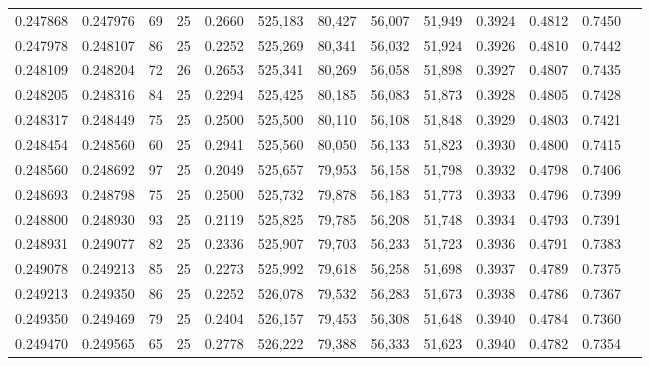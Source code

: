 \begin{tabular}{rrrrrrrrrrrrr}
0.247868 & 0.247976 &    69 &  25 &                                     0.2660 & 525,183 &  80,427 &  56,007 &  51,949 & 0.3924 & 0.4812 & 0.7450 \\
0.247978 & 0.248107 &    86 &  25 &                                     0.2252 & 525,269 &  80,341 &  56,032 &  51,924 & 0.3926 & 0.4810 & 0.7442 \\
0.248109 & 0.248204 &    72 &  26 &                                     0.2653 & 525,341 &  80,269 &  56,058 &  51,898 & 0.3927 & 0.4807 & 0.7435 \\
0.248205 & 0.248316 &    84 &  25 &                                     0.2294 & 525,425 &  80,185 &  56,083 &  51,873 & 0.3928 & 0.4805 & 0.7428 \\
0.248317 & 0.248449 &    75 &  25 &                                     0.2500 & 525,500 &  80,110 &  56,108 &  51,848 & 0.3929 & 0.4803 & 0.7421 \\
0.248454 & 0.248560 &    60 &  25 &                                     0.2941 & 525,560 &  80,050 &  56,133 &  51,823 & 0.3930 & 0.4800 & 0.7415 \\
0.248560 & 0.248692 &    97 &  25 &                                     0.2049 & 525,657 &  79,953 &  56,158 &  51,798 & 0.3932 & 0.4798 & 0.7406 \\
0.248693 & 0.248798 &    75 &  25 &                                     0.2500 & 525,732 &  79,878 &  56,183 &  51,773 & 0.3933 & 0.4796 & 0.7399 \\
0.248800 & 0.248930 &    93 &  25 &                                     0.2119 & 525,825 &  79,785 &  56,208 &  51,748 & 0.3934 & 0.4793 & 0.7391 \\
0.248931 & 0.249077 &    82 &  25 &                                     0.2336 & 525,907 &  79,703 &  56,233 &  51,723 & 0.3936 & 0.4791 & 0.7383 \\
0.249078 & 0.249213 &    85 &  25 &                                     0.2273 & 525,992 &  79,618 &  56,258 &  51,698 & 0.3937 & 0.4789 & 0.7375 \\
0.249213 & 0.249350 &    86 &  25 &                                     0.2252 & 526,078 &  79,532 &  56,283 &  51,673 & 0.3938 & 0.4786 & 0.7367 \\
0.249350 & 0.249469 &    79 &  25 &                                     0.2404 & 526,157 &  79,453 &  56,308 &  51,648 & 0.3940 & 0.4784 & 0.7360 \\
0.249470 & 0.249565 &    65 &  25 &                                     0.2778 & 526,222 &  79,388 &  56,333 &  51,623 & 0.3940 & 0.4782 & 0.7354 \\

\end{tabular}
